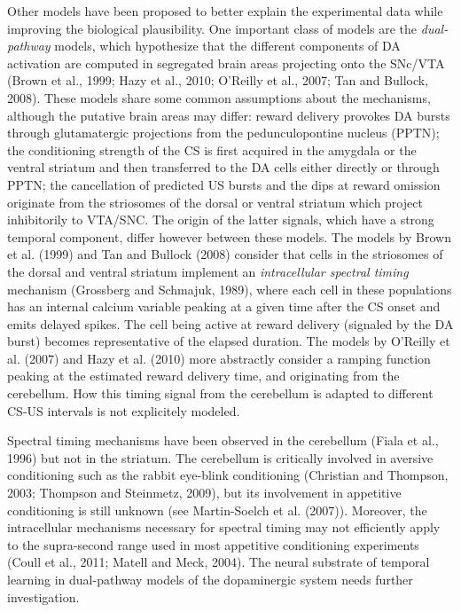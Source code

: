 \documentclass[
  11pt,
  a4paper,
]{scrbook}
\begin{document}
Other models have been proposed to better explain the experimental data
while improving the biological plausibility. One important class of
models are the \emph{dual-pathway} models, which hypothesize that the
different components of DA activation are computed in segregated brain
areas projecting onto the SNc/VTA (Brown et al., 1999; Hazy et al.,
2010; O'Reilly et al., 2007; Tan and Bullock, 2008). These models share
some common assumptions about the mechanisms, although the putative
brain areas may differ: reward delivery provokes DA bursts through
glutamatergic projections from the pedunculopontine nucleus (PPTN); the
conditioning strength of the CS is first acquired in the amygdala or the
ventral striatum and then transferred to the DA cells either directly or
through PPTN; the cancellation of predicted US bursts and the dips at
reward omission originate from the striosomes of the dorsal or ventral
striatum which project inhibitorily to VTA/SNC. The origin of the latter
signals, which have a strong temporal component, differ however between
these models. The models by Brown et al. (1999) and Tan and Bullock
(2008) consider that cells in the striosomes of the dorsal and ventral
striatum implement an \emph{intracellular spectral timing} mechanism
(Grossberg and Schmajuk, 1989), where each cell in these populations has
an internal calcium variable peaking at a given time after the CS onset
and emits delayed spikes. The cell being active at reward delivery
(signaled by the DA burst) becomes representative of the elapsed
duration. The models by O'Reilly et al. (2007) and Hazy et al. (2010)
more abstractly consider a ramping function peaking at the estimated
reward delivery time, and originating from the cerebellum. How this
timing signal from the cerebellum is adapted to different CS-US
intervals is not explicitely modeled.

Spectral timing mechanisms have been observed in the cerebellum (Fiala
et al., 1996) but not in the striatum. The cerebellum is critically
involved in aversive conditioning such as the rabbit eye-blink
conditioning (Christian and Thompson, 2003; Thompson and Steinmetz,
2009), but its involvement in appetitive conditioning is still unknown
(see Martin-Soelch et al. (2007)). Moreover, the intracellular
mechanisms necessary for spectral timing may not efficiently apply to
the supra-second range used in most appetitive conditioning experiments
(Coull et al., 2011; Matell and Meck, 2004). The neural substrate of
temporal learning in dual-pathway models of the dopaminergic system
needs further investigation.
\end{document}
